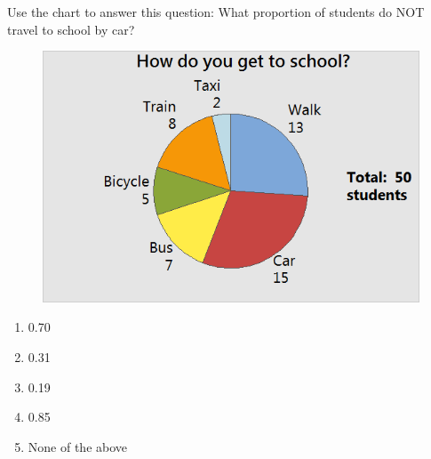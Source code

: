 \documentclass[11.5pt]{sig-alternate} %
\begin{document}
\begin{large}
Use the chart to answer this question: What proportion of students do NOT travel to school by car?
\begin{figure}[h]
    \centering
    \includegraphics[width=0.5\linewidth]{images/q7.png}
\end{figure}
\begin{enumerate}[label=\Alph*.]
    \item 0.70
    \item 0.31
    \item 0.19
    \item 0.85
    \item None of the above
\end{enumerate}
 
\end{large}
\end{document}
